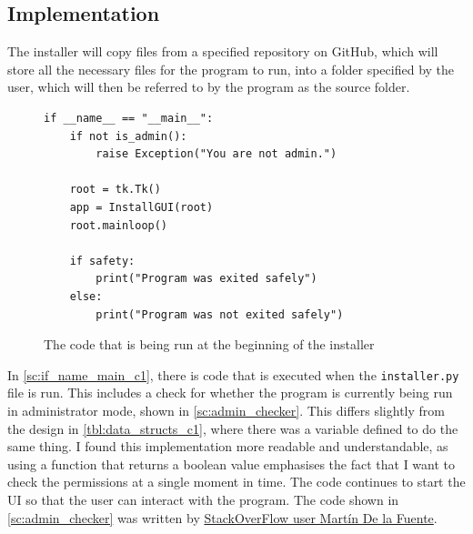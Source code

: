 \documentclass[11pt]{article}
\begin{document}
        \subsection{Implementation}

            The installer will copy files from a specified repository on GitHub, which will store all the necessary files for the program to run, into a folder specified by the user, which will then be referred to by the program as the source folder. 

            \begin{figure}[!ht]
                \begin{verbatim}
if __name__ == "__main__":
    if not is_admin():
        raise Exception("You are not admin.")
        
    root = tk.Tk()
    app = InstallGUI(root)
    root.mainloop()
    
    if safety:
        print("Program was exited safely")
    else:
        print("Program was not exited safely")
                \end{verbatim}
                \caption{The code that is being run at the beginning of the installer}
                \label{sc:if_name_main_c1}
            \end{figure}

            In \autoref{sc:if_name_main_c1}, there is code that is executed when the \verb|installer.py| file is run. This includes a check for whether the program is currently being run in administrator mode, shown in \autoref{sc:admin_checker}. This differs slightly from the design in \autoref{tbl:data_structs_c1}, where there was a variable defined to do the same thing. I found this implementation more readable and understandable, as using a function that returns a boolean value emphasises the fact that I want to check the permissions at a single moment in time. The code continues to start the UI so that the user can interact with the program. The code shown in \autoref{sc:admin_checker} was written by \href{https://stackoverflow.com/questions/130763/request-uac-elevation-from-within-a-python-script}{StackOverFlow user Martín De la Fuente}.
\end{document}
